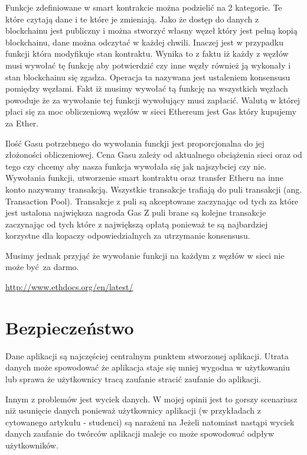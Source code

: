 \documentclass[]{llncs}
\begin{document}
  Funkcje zdefiniowane w smart kontrakcie można podzielić na 2 kategorie. Te
  które czytają dane i te które je zmieniają. Jako że dostęp do danych z
  blockchainu jest publiczny i można stworzyć własny węzeł który jest pełną
  kopią blockchainu, dane można odczytać w każdej chwili. Inaczej jest w
  przypadku funkcji która modyfikuje stan kontraktu. Wynika to z faktu iż każdy
  z węzłów musi wywołać tę funkcję aby potwierdzić czy inne węzły również ją
  wykonały i stan blockchainu się zgadza. Operacja ta nazywana jest ustaleniem
  konsensusu pomiędzy węzłami. Fakt iż musimy wywołać tą funkcję na wszystkich
  węzłach powoduje że za wywołanie tej funkcji wywołujący musi zapłacić. Walutą
  w której płaci się za moc obliczeniową węzłów w sieci Ethereum jest Gas który
  kupujemy za Ether.

  Ilość Gasu potrzebnego do wywołania funckji jest proporcjonalna do jej
  złożoności obliczeniowej. Cena Gasu zależy od aktualnego obciążenia sieci oraz
  od tego czy chcemy aby nasza funkcja wywołała się jak najszybciej czy nie.
  Wywołania funkcji, utworzenie smart kontraktu oraz transfer Etheru na inne
  konto nazywamy transakcją. Wszystkie transakcje trafiają do puli transakcji
  (ang. Transaction Pool). Transakcje z puli są akceptowane zaczynając od tych
  za które jest ustalona największa nagroda  Gas Z puli brane są kolejne
  transakcje zaczynając od tych które z największą opłatą ponieważ te są
  najbardziej korzystne dla kopaczy odpowiedzialnych za utrzymanie konsensusu.

  Musimy jednak przyjąć że wywołanie funkcji na
  każdym z węzłów w sieci nie może być za darmo.

  \url{http://www.ethdocs.org/en/latest/}

\section{Bezpieczeństwo}

  Dane aplikacji są najczęściej centralnym punktem stworzonej aplikacji. Utrata
  danych może spowodować że aplikacja staje się mniej wygodna w
  użytkowaniu\cite{teatr-wspolczesny-utrata-danych} lub sprawa że użytkownicy
  tracą zaufanie stracić zaufanie do aplikacji\cite{nazwa-pl-utrata-danych}.

  Innym z problemów jest wyciek danych\cite{wyciek-danych-studentow}. W mojej
  opinii jest to gorszy scenariusz niż usunięcie danych ponieważ użytkownicy
  aplikacji (w przykładach z cytowanego artykułu - studenci) są narażeni na
  Jeżeli natomiast nastąpi wyciek danych zaufanie do twórców aplikacji maleje co
  może spowodować odpływ użytkowników.
\end{document}

